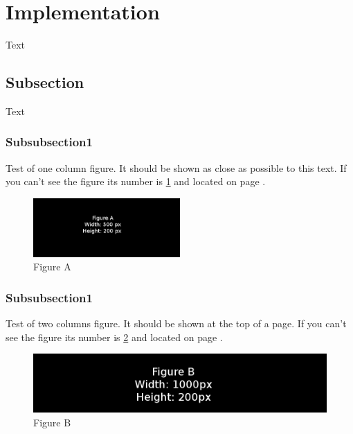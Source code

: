 \section{Implementation}\label{sec:implementation}
Text

\subsection{Subsection}
Text
\subsubsection{Subsubsection1}
Test of one column figure. It should be shown as close as possible to this
text. If you can't see the figure its number is \ref{fig:one_column_figure}
and located on page \pageref{fig:one_column_figure}.
\begin{figure}[h]
    \includegraphics[width=0.5\textwidth]{./figure/figureA.png}
    \caption{Figure A}
    \label{fig:one_column_figure}
\end{figure}

\subsubsection{Subsubsection1}
Test of two columns figure. It should be shown at the top of a page. If you
can't see the figure its number is \ref{fig:two_column_figure}
and located on page \pageref{fig:two_column_figure}.
\begin{figure}[t]
    \includegraphics[width=1.0\textwidth]{./figure/figureB.png}
    \caption{Figure B}
    \label{fig:two_column_figure}
\end{figure}
